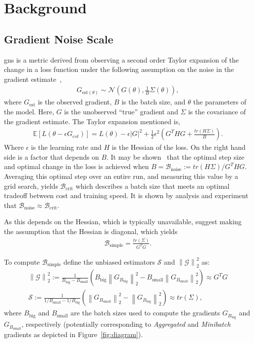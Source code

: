 \documentclass{article}
\newcommand{\Bcrit}{\mathcal{B}_{\textrm{crit}}}
\newcommand{\Bnoise}{\mathcal{B}_{\textrm{noise}}}
\newcommand{\Bsimple}{\mathcal{B}_{\textrm{simple}}}
\newcommand{\Bbig}{B_{\textrm{big}}}
\newcommand{\Bsmall}{B_{\textrm{small}}}
\newcommand{\Gbig}{G_{B_{\textrm{big}}}} %
\newcommand{\Gsmall}{G_{B_{\textrm{small}}}} %
\newcommand{\sqn}[1]{\left\lVert#1\right\rVert_2^2}
\begin{document}
\section{Background}\label{background}

\subsection{Gradient Noise Scale}\label{gns}

\ac{gns} is a metric derived from observing a second order Taylor expansion of
the change in a loss function under the following assumption on the noise in the
gradient estimate~\citep{mccandlish2018empirical},
\begin{align}
    G_{\text{est}(\theta)} \sim \mathcal{N} \left(G (\theta), \frac{1}{B} \Sigma (\theta) \right),
\end{align}
where $G_{\text{est}}$ is the observed gradient, $B$ is the batch size, and $\theta$ the parameters
of the model. Here, $G$ is the unobserved ``true'' gradient and $\Sigma$ is the
covariance of the gradient estimate. The Taylor expansion mentioned is,
\begin{align}
    \mathbb{E}[L(\theta - \epsilon G_{est})] = L(\theta) - \epsilon |G|^2 + \frac{1}{2} \epsilon^2 \left( G^T HG + \frac{tr(H\Sigma)}{B} \right).
\end{align}
Where $\epsilon$ is the learning rate and $H$ is the Hessian of the loss.
On the right hand side is a factor that depends on $B$.
It may be shown~\citep{mccandlish2018empirical} that the optimal step size and optimal change
in the loss is achieved when $B = \Bnoise := tr(H \Sigma) / G^T H G$.
Averaging this optimal step over an entire run,
and measuring this value by a grid search, yields $\Bcrit$ which describes
a batch size that meets an optimal tradeoff between cost and training speed.
It is shown by analysis and experiment that $\Bnoise \approx \Bcrit$.

As this depends on the Hessian, which is typically unavailable,
\citet{mccandlish2018empirical} suggest making the assumption that the Hessian
is diagonal, which yields
\begin{align}
    \Bsimple = \frac{tr(\Sigma)}{G^T G}.
\end{align}

To compute $\Bsimple$ \citet{mccandlish2018empirical} define the
unbiased estimators $\mathcal{S}$ and $\sqn{\mathcal{G}}$ as:
\begin{align}
    \sqn{\mathcal{G}} := \frac{1}{\Bbig - \Bsmall} \left( \Bbig \sqn{ \Gbig } - \Bsmall \sqn{\Gsmall} \right) \approx G^T G \label{eq:g-est}\\
    \mathcal{S} := \frac{1}{1 / \Bsmall - 1 / \Bbig} \left( \sqn{\Gsmall} - \sqn{\Gbig} \right) \approx tr(\Sigma),
    \label{eq:s-est}
\end{align}
where $\Bbig$ and $\Bsmall$ are the batch sizes used to compute the gradients
$\Gbig$ and $\Gsmall$, respectively (potentially corresponding to \emph{Aggregated} and \emph{Minibatch} gradients as depicted in Figure~\ref{fig:diagram}).
\end{document}
